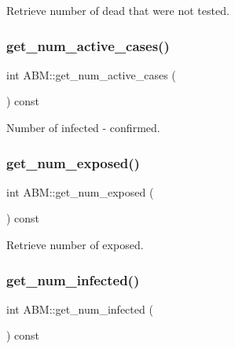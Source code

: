 Retrieve number of dead that were not tested. 

\mbox{\label{classABM_a90555a3d3f12fbd59449d1bd97325caf}} 
\subsubsection{\texorpdfstring{get\+\_\+num\+\_\+active\+\_\+cases()}{get\_num\_active\_cases()}}
{\footnotesize\ttfamily int A\+B\+M\+::get\+\_\+num\+\_\+active\+\_\+cases (\begin{DoxyParamCaption}{ }\end{DoxyParamCaption}) const}



Number of infected -\/ confirmed. 

\mbox{\label{classABM_aeb5f873f0938afa13c28ff4cbfa9c07a}} 
\subsubsection{\texorpdfstring{get\+\_\+num\+\_\+exposed()}{get\_num\_exposed()}}
{\footnotesize\ttfamily int A\+B\+M\+::get\+\_\+num\+\_\+exposed (\begin{DoxyParamCaption}{ }\end{DoxyParamCaption}) const}



Retrieve number of exposed. 

\mbox{\label{classABM_a706d258fe6b07f554703d8eceeda4479}} 
\subsubsection{\texorpdfstring{get\+\_\+num\+\_\+infected()}{get\_num\_infected()}}
{\footnotesize\ttfamily int A\+B\+M\+::get\+\_\+num\+\_\+infected (\begin{DoxyParamCaption}{ }\end{DoxyParamCaption}) const}




